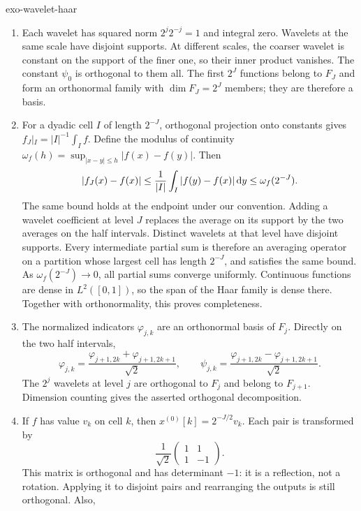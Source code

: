 \begin{correction}{exo-wavelet-haar}
\begin{enumerate}
\item Each wavelet has squared norm $2^j2^{-j}=1$ and integral zero.
Wavelets at the same scale have disjoint supports. At different scales,
the coarser wavelet is constant on the support of the finer one, so their
inner product vanishes. The constant $\psi_0$ is orthogonal to them all.
The first $2^J$ functions belong to $F_J$ and form an orthonormal family
with $\dim F_J=2^J$ members; they are therefore a basis.
\item For a dyadic cell $I$ of length $2^{-J}$, orthogonal projection onto
constants gives $f_J|_I=|I|^{-1}\int_I f$. Define the modulus of continuity
$\omega_f(h)=\sup_{|x-y|\leq h}|f(x)-f(y)|$. Then
\[
 |f_J(x)-f(x)|\leq\frac1{|I|}\int_I|f(y)-f(x)|\,\mathrm{d} y
                  \leq\omega_f(2^{-J}).
\]
The same bound holds at the endpoint under our convention.
Adding a wavelet coefficient at level $J$ replaces the average on its
support by the two averages on the half intervals. Distinct wavelets at
that level have disjoint supports. Every intermediate partial sum is
therefore an averaging operator on a partition whose largest cell has
length $2^{-J}$, and satisfies the same bound.
As $\omega_f(2^{-J})\to0$, all partial sums converge uniformly.
Continuous functions are dense in $L^2([0,1])$, so the span of the Haar
family is dense there. Together with orthonormality, this proves completeness.
\item The normalized indicators $\varphi_{j,k}$ are an orthonormal basis
of $F_j$. Directly on the two half intervals,
\begin{equation}
\label{eqn-recurrence-wavelets-haar}
 \varphi_{j,k}=\frac{\varphi_{j+1,2k}+\varphi_{j+1,2k+1}}{\sqrt2},
 \qquad
 \psi_{j,k}=\frac{\varphi_{j+1,2k}-\varphi_{j+1,2k+1}}{\sqrt2}.
\end{equation}
The $2^j$ wavelets at level $j$ are orthogonal to $F_j$ and belong to
$F_{j+1}$. Dimension counting gives the asserted orthogonal decomposition.
\item If $f$ has value $v_k$ on cell $k$, then
$x^{(0)}[k]=2^{-J/2}v_k$.
Each pair is transformed by
\[
 \frac1{\sqrt2}\begin{pmatrix}1&1\\1&-1\end{pmatrix}.
\]
This matrix is orthogonal and has determinant $-1$: it is a reflection,
not a rotation. Applying it to disjoint pairs and rearranging the outputs
is still orthogonal. Also,

\end{enumerate}
\end{correction}
